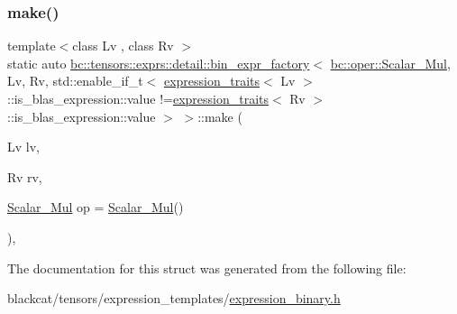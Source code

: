 \subsubsection{\texorpdfstring{make()}{make()}}
{\footnotesize\ttfamily template$<$class Lv , class Rv $>$ \\
static auto \hyperlink{structbc_1_1tensors_1_1exprs_1_1detail_1_1bin__expr__factory}{bc\+::tensors\+::exprs\+::detail\+::bin\+\_\+expr\+\_\+factory}$<$ \hyperlink{structbc_1_1oper_1_1Scalar__Mul}{bc\+::oper\+::\+Scalar\+\_\+\+Mul}, Lv, Rv, std\+::enable\+\_\+if\+\_\+t$<$ \hyperlink{structbc_1_1tensors_1_1exprs_1_1expression__traits}{expression\+\_\+traits}$<$ Lv $>$\+::is\+\_\+blas\+\_\+expression\+::value !=\hyperlink{structbc_1_1tensors_1_1exprs_1_1expression__traits}{expression\+\_\+traits}$<$ Rv $>$\+::is\+\_\+blas\+\_\+expression\+::value $>$ $>$\+::make (\begin{DoxyParamCaption}\item[{Lv}]{lv,  }\item[{Rv}]{rv,  }\item[{\hyperlink{structbc_1_1oper_1_1Scalar__Mul}{Scalar\+\_\+\+Mul}}]{op = {\ttfamily \hyperlink{structbc_1_1oper_1_1Scalar__Mul}{Scalar\+\_\+\+Mul}()} }\end{DoxyParamCaption})\hspace{0.3cm}{\ttfamily [inline]}, {\ttfamily [static]}}



The documentation for this struct was generated from the following file\+:\begin{DoxyCompactItemize}
\item 
blackcat/tensors/expression\+\_\+templates/\hyperlink{expression__binary_8h}{expression\+\_\+binary.\+h}\end{DoxyCompactItemize}
